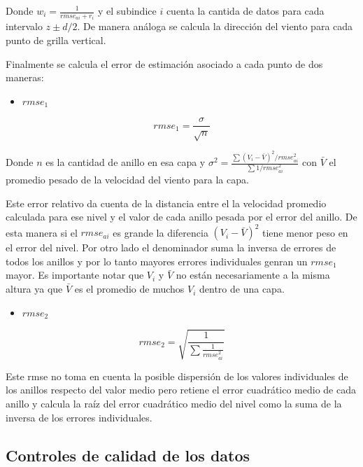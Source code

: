 \documentclass[12pt,spanish,oneside]{book}
\providecommand{\tightlist}{%
  \setlength{\itemsep}{0pt}\setlength{\parskip}{0pt}}
\begin{document}
Donde \(w_i = \frac {1}{rmse_{ai} + r_i}\) y el subindice \(i\) cuenta
la cantida de datos para cada intervalo \(z \pm d/2\). De manera análoga
se calcula la dirección del viento para cada punto de grilla vertical.

Finalmente se calcula el error de estimación asociado a cada punto de
dos maneras:

\begin{itemize}
\tightlist
\item
  \textbf{\(rmse_1\)}
\end{itemize}

\begin{equation}\label{eq-vr10} 
rmse_1 = \frac{\sigma}{\sqrt{n}}
\end{equation}

Donde \(n\) es la cantidad de anillo en esa capa y
\(\sigma^{2}= \frac{\sum (V_i - \bar{V})^2 /rmse_{ai}^2}{\sum 1/rmse_{ai}^2}\)
con \(\bar{V}\) el promedio pesado de la velocidad del viento para la
capa.

Este error relativo da cuenta de la distancia entre el la velocidad
promedio calculada para ese nivel y el valor de cada anillo pesada por
el error del anillo. De esta manera si el \(rmse_{ai}\) es grande la
diferencia \((V_i - \bar{V})^2\) tiene menor peso en el error del nivel.
Por otro lado el denominador suma la inversa de errores de todos los
anillos y por lo tanto mayores errores individuales genran un \(rmse_1\)
mayor. Es importante notar que \(V_i\) y \(\bar{V}\) no están
necesariamente a la misma altura ya que \(\bar{V}\) es el promedio de
muchos \(V_i\) dentro de una capa.

\begin{itemize}
\tightlist
\item
  \textbf{\(rmse_2\)}
\end{itemize}

\begin{equation}\label{eq-vr11}
rmse_2 = \sqrt{\frac{1}{\sum \frac{1}{rmse_{ai}^2}}}
\end{equation}

Este rmse no toma en cuenta la posible dispersión de los valores
individuales de los anillos respecto del valor medio pero retiene el
error cuadrático medio de cada anillo y calcula la raíz del error
cuadrático medio del nivel como la suma de la inversa de los errores
individuales.

\subsection{Controles de calidad de los
datos}\label{controles-de-calidad-de-los-datos}
\end{document}
